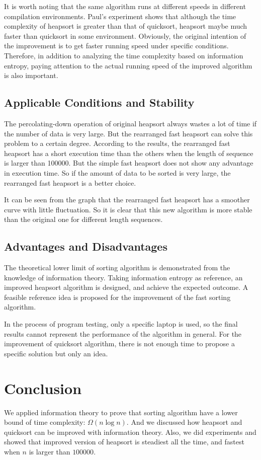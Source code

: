 \documentclass[12pt]{extarticle}
\newcommand{\<}{\langle}
\renewcommand{\>}{\rangle}
\theoremstyle{definition}
\begin{document}
It is worth noting that the same algorithm runs at different speeds in different compilation environments. Paul's \cite{paul1} experiment shows that although the time complexity of heapsort is greater than that of quicksort, heapsort maybe much faster than quicksort in some environment. Obviously, the original intention of the improvement is to get faster running speed under specific conditions. Therefore, in addition to analyzing the time complexity based on information entropy, paying attention to the actual running speed of the improved algorithm is also important.

\subsection{Applicable Conditions and Stability}

The percolating-down operation of original heapsort always wastes a lot of time if the number of data is very large. But the rearranged fast heapsort can solve this problem to a certain degree. According to the results, the rearranged fast heapsort has a short execution time than the others when the length of sequence is larger than 100000. But the simple fast heapsort does not show any advantage in execution time. So if the amount of data to be sorted is very large, the rearranged fast heapsort is a better choice.

It can be seen from the graph that the rearranged fast heapsort has a smoother curve with little fluctuation. So it is clear that this new algorithm is more stable than the original one for different length sequences.

\subsection{Advantages and Disadvantages}

The theoretical lower limit of sorting algorithm is demonstrated from the knowledge of information theory. Taking information entropy as reference, an improved heapsort algorithm is designed, and achieve the expected outcome. A feasible reference idea is proposed for the improvement of the fast sorting algorithm.

In the process of program testing, only a specific laptop is used, so the final results cannot represent the performance of the algorithm in general. For the improvement of quicksort algorithm, there is not enough time to propose a specific solution but only an idea.

\section{Conclusion}

We applied information theory to prove that sorting algorithm have a lower bound of time complexity: $\Omega(n\log n)$. And we discussed how heapsort and quicksort can be improved with information theory. Also, we did experiments and showed that improved version of heapsort is steadiest all the time, and fastest when $n$ is larger than $100000$.


\end{document}
